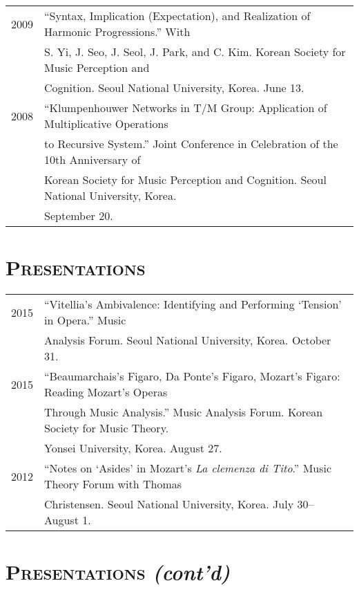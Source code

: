 \documentclass[a4paper,11pt]{article}
\begin{document}
\begin{tabular}{p{2.5cm} p{12.5cm}}
  2009 & “Syntax, Implication (Expectation), and Realization of Harmonic Progressions.” With\\
  & S. Yi, J. Seo, J. Seol, J. Park, and C. Kim. Korean Society for Music Perception and\\
  & Cognition. Seoul National University, Korea. June 13.\\[2mm]

  2008 & “Klumpenhouwer Networks in T/M Group: Application of Multiplicative Operations\\
  & to Recursive System.” Joint Conference in Celebration of the 10th Anniversary of\\
  & Korean Society for Music Perception and Cognition. Seoul National University, Korea.\\
  & September 20.
  \end{tabular}
  
  \vspace{5.0mm}
  
  \section*{\textsc{Presentations}}
  
  \hspace*{-0.25cm}
  \begin{tabular}{p{2.5cm} p{12.5cm}}
  2015 & ``Vitellia’s Ambivalence: Identifying and Performing ‘Tension’ in Opera.'' Music\\
  & Analysis Forum. Seoul National University, Korea. October 31.\\[2mm]
  
  2015 & ``Beaumarchais's Figaro, Da Ponte's Figaro, Mozart's Figaro: Reading Mozart's Operas\\
  & Through Music Analysis.'' Music Analysis Forum. Korean Society for Music Theory.\\
  & Yonsei University, Korea. August 27.\\[2mm]
  
  2012 & “Notes on ‘Asides’ in Mozart’s \textit{La clemenza di Tito}.” Music Theory Forum with Thomas\\
  & Christensen. Seoul National University, Korea. July 30–August 1.
  \end{tabular}

  \section*{\textsc{Presentations} \textit{(cont'd)}}
  
\end{document}
